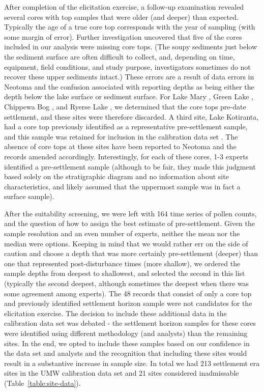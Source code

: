 \documentclass[12pt]{article}
\begin{document}
After completion of the elicitation exercise, a follow-up examination
revealed several cores with top samples that were older (and deeper)
than expected. Typically the age of a true core top corresponds with
the year of sampling (with some margin of error). Further
investigation uncovered that five of the cores included in our
analysis were missing core tops. (The soupy sediments just below the
sediment surface are often difficult to collect, and, depending on
time, equipment, field conditions, and study purpose, investigators
sometimes do not recover these upper sediments intact.) These errors
are a result of data errors in Neotoma and the confusion associated
with reporting depths as being either the depth below the lake surface
or sediment surface. For Lake Mary \citep{webb1971late}, Green Lake
\citep{lawrenz1975}, Chippewa Bog \citep{bailey1981late}, and Ryerse
Lake \citep{futyma1982postglacial}, we determined that the core tops
pre-date settlement, and these sites were therefore discarded. A third
site, Lake Kotiranta, had a core top previously identified as a
representative pre-settlement sample, and this sample was retained for
inclusion in the calibration data set \citep{wright1969}. The absence
of core tops at these sites have been reported to Neotoma and the
records amended accordingly. Interestingly, for each of these cores,
1-3 experts identified a pre-settlement sample (although to be fair,
they made this judgment based solely on the stratigraphic diagram and
no information about site characteristics, and likely assumed that the
uppermost sample was in fact a surface sample).

After the suitability screening, we were left with 164 time series of
pollen counts, and the question of how to assign the best estimate of
pre-settlement. Given the sample resolution and an even number of
experts, neither the mean nor the median were options. Keeping in mind
that we would rather err on the side of caution and choose a depth
that was more certainly pre-settlement (deeper) than one that
represented post-disturbance times (more shallow), we ordered the
sample depths from deepest to shallowest, and selected the second in
this list (typically the second deepest, although sometimes the
deepest when there was some agreement among experts).  The 48 records
that consist of only a core top and previously identified settlement
horizon sample were not candidates for the elicitation exercise. The
decision to include these additional data in the calibration data set
was debated - the settlement horizon samples for these cores were
identified using different methodology (and analysts) than the
remaining sites. In the end, we opted to include these samples based
on our confidence in the data set and analysts and the recognition
that including these sites would result in a substantive increase in
sample size. In total we had 213 settlememt era sites in the UMW
calibration data set and 21 sites considered inadmissable
(Table~\ref{table:site-data}).
\end{document}
